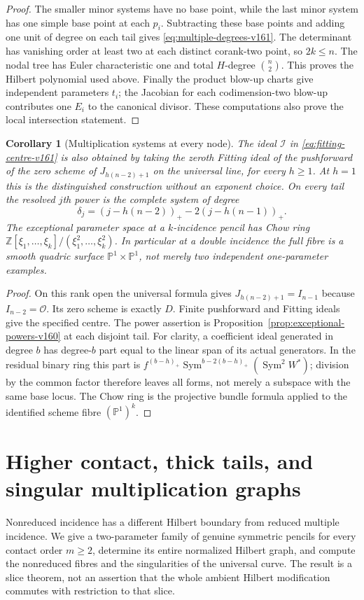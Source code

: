 \documentclass[11pt,reqno]{amsart}
\numberwithin{equation}{section}
\newtheorem{corollary}[theorem]{Corollary}
\theoremstyle{definition}\newtheorem{definition}[theorem]{Definition}
\theoremstyle{remark}\newtheorem{remark}[theorem]{Remark}
\newcommand{\Pj}{\mathbb P}\newcommand{\A}{\mathbb A}
\newcommand{\OO}{\mathcal O}\newcommand{\II}{\mathcal I}
\DeclareMathOperator{\Sym}{Sym}\DeclareMathOperator{\Gr}{Gr}
\begin{document}
\begin{proof}
The smaller minor systems have no base point, while the last minor
system has one simple base point at each $p_i$. Subtracting these
base points and adding one unit of degree on each tail gives
\eqref{eq:multiple-degrees-v161}. The determinant has vanishing order
at least two at each distinct corank-two point, so $2k\leq n$.
The nodal tree has Euler characteristic one and total $H$-degree
$\binom n2$. This proves the Hilbert polynomial used above. Finally
the product blow-up charts give independent parameters $t_i$; the
Jacobian for each codimension-two blow-up contributes one $E_i$ to
the canonical divisor. These computations also prove the local
intersection statement.
\end{proof}

\begin{corollary}[Multiplication systems at every node]
\label{cor:multi-powers-v161}
The ideal $\mathcal I$ in \eqref{eq:fitting-centre-v161} is also obtained
by taking the zeroth Fitting ideal of the pushforward of the zero
scheme of $J_{h(n-2)+1}$ on the universal line, for every $h\geq1$.
At $h=1$ this is the distinguished construction without an exponent
choice. On every tail the resolved $j$th power is the complete system
of degree
\[
 \delta_j=(j-h(n-2))_+-2(j-h(n-1))_+.
\]
The exceptional parameter space at a $k$-incidence pencil has Chow
ring $\mathbb Z[\xi_1,\ldots,\xi_k]/(\xi_1^2,\ldots,\xi_k^2)$.
In particular at a double incidence the full fibre is a smooth
quadric surface $\Pj^1\times\Pj^1$, not merely two independent
one-parameter examples.
\end{corollary}
\begin{proof}
On this rank open the universal formula gives
$J_{h(n-2)+1}=I_{n-1}$ because $I_{n-2}=\OO$. Its zero scheme is
exactly $D$. Finite pushforward and Fitting ideals give the specified
centre. The power assertion is Proposition~\ref{prop:exceptional-powers-v160}
at each disjoint tail. For clarity, a coefficient ideal generated in
degree $b$ has degree-$b$ part equal to the linear span of its actual
generators. In the residual binary ring this part is
$f^{(b-h)_+}\Sym^{b-2(b-h)_+}(\Sym^2W^*)$; division by the common
factor therefore leaves all forms, not merely a subspace with the
same base locus. The Chow ring is the projective bundle formula
applied to the identified scheme fibre $(\Pj^1)^k$.
\end{proof}

\section{Higher contact, thick tails, and singular multiplication graphs}
\label{sec:higher-contact-v161}
Nonreduced incidence has a different Hilbert boundary from reduced
multiple incidence. We give a two-parameter family of genuine symmetric
pencils for every contact order $m\geq2$, determine its entire normalized
Hilbert graph, and compute the nonreduced fibres and the singularities
of the universal curve. The result is a slice theorem, not an assertion
that the whole ambient Hilbert modification commutes with restriction
to that slice.
\end{document}
